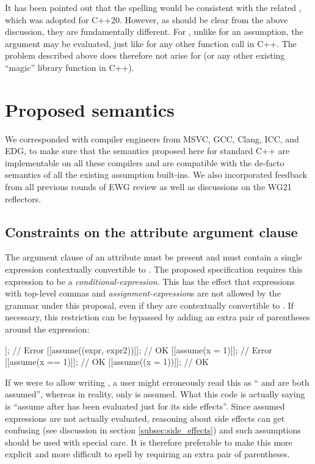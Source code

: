 It has been pointed out that the spelling  would be consistent with the related , which was adopted for C++20. However, as should be clear from the above discussion, they are fundamentally different. For ,  unlike for an assumption, the argument may be evaluated, just like for any other function call in C++. The problem described above does therefore not arise for  (or any other existing ``magic'' library function in C++).



\section{Proposed semantics}
\label{sec:semantics}

We corresponded with compiler engineers from MSVC, GCC, Clang, ICC, and EDG, to make sure that the semantics proposed here for standard C++ are implementable on all these compilers and are compatible with the de-facto semantics of all the existing assumption built-ins. We also incorporated feedback from all previous rounds of EWG review as well as discussions on the WG21 reflectors.

\subsection{Constraints on the attribute argument clause}

The argument clause of an  attribute must be present and must contain a single expression contextually convertible to . The proposed specification requires this expression to be a \emph{conditional-expression}. This has the effect that expressions with top-level commas and \emph{assignment-expression}s are not allowed by the grammar under this proposal, even if they are contextually convertible to . If necessary, this restriction can be bypassed by adding an extra pair of parentheses around the expression:

\begin{codeblock}
[[assume(expr1, expr2)]];  // Error
[[assume((expr, expr2))]]; // OK
[[assume(x = 1)]];         // Error
[[assume(x == 1)]];        // OK
[[assume((x = 1))]];       // OK
\end{codeblock}

If we were to allow writing , a user might erroneously read this as `` and  are both assumed'', whereas in reality, only  is assumed. What this code is actually saying is ``assume  after  has been evaluated just for its side effects''. Since assumed expressions are not actually evaluated, reasoning about side effects can get confusing (see discussion in section \ref{subsec:side_effects}) and such assumptions should be used with special care. It is therefore preferable to make this more explicit and more difficult to spell by requiring an extra pair of parentheses.

